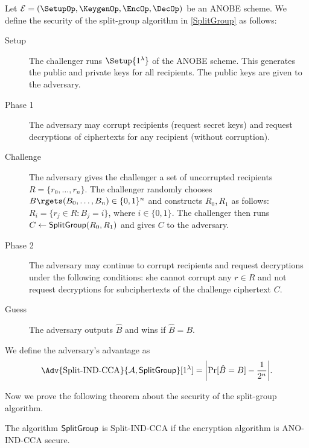 \begin{definition}\label{SplitGroupSecurity}
  Let \(\mathcal{E} = (\SetupOp, \KeygenOp, \EncOp, \DecOp)\) be an \ac{ANOBE} 
  scheme.
  We define the security of the split-group algorithm in \cref{SplitGroup} as 
  follows:
  \begin{description}
    \item[Setup] The challenger runs \(\Setup{1^\lambda}\) of the \ac{ANOBE} 
      scheme.
      This generates the public and private keys for all recipients.
      The public keys are given to the adversary.

    \item[Phase 1] The adversary may corrupt recipients (request secret keys) 
      and request decryptions of ciphertexts for any recipient (without 
      corruption).

    \item[Challenge] The adversary gives the challenger a set of uncorrupted 
      recipients \(R = \{r_0, \ldots, r_n\}\).
      The challenger randomly chooses \(B\rgets (B_0, \ldots, B_n) \in \{0, 
        1\}^n\) and constructs \(R_0, R_1\) as follows:
      \(R_i = \{ r_j\in R\colon B_j = i\}\), where \(i\in \{0, 1\}\).
      The challenger then runs \(C\gets \SplitGroup[R_0, R_1]\) and gives \(C\) 
      to the adversary.

    \item[Phase 2] The adversary may continue to corrupt recipients and request 
      decryptions under the following conditions:
      she cannot corrupt any \(r\in R\) and not request decryptions for 
      subciphertexts of the challenge ciphertext \(C\).

    \item[Guess] The adversary outputs \(\hat{B}\) and wins if \(\hat{B} 
        = B\).
  \end{description}
  We define the adversary's advantage as \[\Adv{\text{Split-IND-CCA}}{\A, 
      \SplitGroupOp}[1^\lambda] = \mleft|\Pr[ \hat{B} 
    = B ] - \frac{1}{2^n}\mright|.\]
\end{definition}

Now we prove the following theorem about the security of the split-group 
algorithm.

\begin{theorem}
  The algorithm \(\operatorname{\mathsf{SplitGroup}}\) is Split-IND-CCA if the encryption algorithm 
  is ANO-IND-CCA secure.
\end{theorem}

